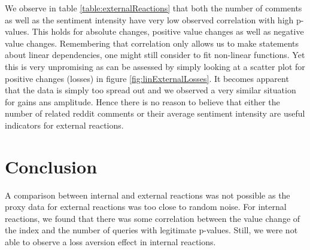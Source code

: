 \documentclass[12pt]{article}
\begin{document}
We observe in table \ref{table:externalReactions} that both the number of comments as well as the sentiment intensity have very low observed correlation with high p-values. This holds for absolute changes, positive value changes as well as negative value changes. Remembering that correlation only allows us to make statements about linear dependencies, one might still consider to fit non-linear functions. Yet this is very unpromising as can be assessed by simply looking at a scatter plot for positive changes (losses) in figure \ref{fig:linExternalLosses}. It becomes apparent that the data is simply too spread out and we observed a very similar situation for gains ans amplitude. Hence there is no reason to believe that either the number of related reddit comments or their average sentiment intensity are useful indicators for external reactions.



\section{Conclusion}

A comparison between internal and external reactions was not possible as the proxy data for external reactions was too close to random noise. For internal reactions, we found that there was some correlation between the value change of the index and the number of queries with legitimate p-values. Still, we were not able to observe a loss aversion effect in internal reactions.
\end{document}
